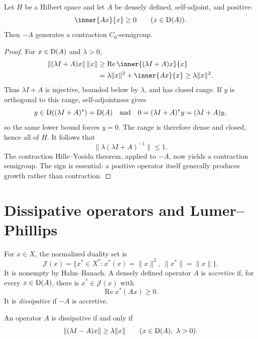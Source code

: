 \begin{noteproposition}
Let $H$ be a Hilbert space and let $A$ be densely defined, self-adjoint, and
positive:
\[
  \inner{Ax}{x}\ge0
  \qquad(x\in\Dom(A)).
\]
Then $-A$ generates a contraction $C_0$-semigroup.
\end{noteproposition}

\begin{proof}
For $x\in\operatorname{D}(A)$ and $\lambda>0$,
\[
\begin{aligned}
  \|(\lambda I+A)x\|\,\|x\|
   &\ge\operatorname{Re}\inner{(\lambda I+A)x}{x}\\
   &=\lambda\|x\|^2+\inner{Ax}{x}
    \ge\lambda\|x\|^2.
\end{aligned}
\]
Thus $\lambda I+A$ is injective, bounded below by $\lambda$, and has closed
range.  If $y$ is orthogonal to this range, self-adjointness gives
\[
  y\in\operatorname{D}((\lambda I+A)^*)=\operatorname{D}(A)
  \quad\text{and}\quad
  0=(\lambda I+A)^*y=(\lambda I+A)y,
\]
so the same lower bound forces $y=0$.  The range is therefore dense and closed,
hence all of $H$.  It follows that
\[
  \|\lambda(\lambda I+A)^{-1}\|\le1.
\]
The contraction Hille--Yosida theorem, applied to $-A$, now yields a
contraction semigroup.  The sign is essential: a positive operator itself
generally produces growth rather than contraction.
\end{proof}

\section{Dissipative operators and Lumer--Phillips}

\begin{notedefinition}
For $x\in X$, the normalized duality set is
\[
  \mathcal J(x)
  =\{x^*\in X^*:x^*(x)=\|x\|^2,
                    \ \|x^*\|=\|x\|\}.
\]
It is nonempty by Hahn--Banach.  A densely defined operator $A$ is
\emph{accretive} if, for every $x\in\operatorname{D}(A)$, there is
$x^*\in\mathcal J(x)$ with
\[
  \operatorname{Re}x^*(Ax)\ge0.
\]
It is \emph{dissipative} if $-A$ is accretive.
\end{notedefinition}

\begin{noteproposition}
An operator $A$ is dissipative if and only if
\[
  \|(\lambda I-A)x\|\ge\lambda\|x\|
  \qquad(x\in\operatorname{D}(A),\ \lambda>0).
\]
\end{noteproposition}

